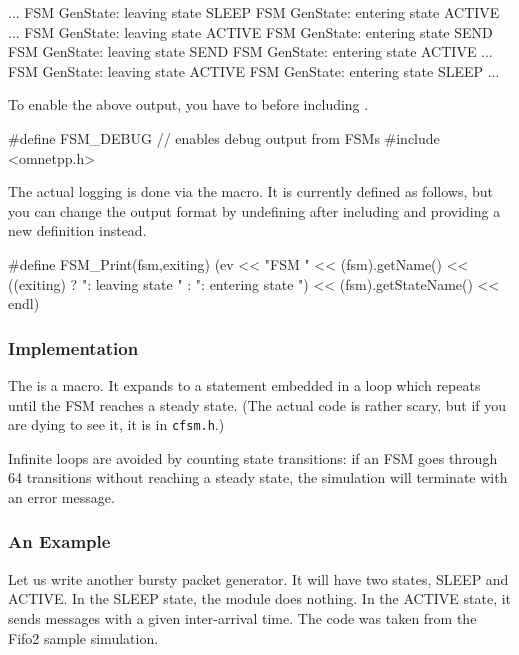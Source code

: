 \begin{filelisting}
...
FSM GenState: leaving state SLEEP
FSM GenState: entering state ACTIVE
...
FSM GenState: leaving state ACTIVE
FSM GenState: entering state SEND
FSM GenState: leaving state SEND
FSM GenState: entering state ACTIVE
...
FSM GenState: leaving state ACTIVE
FSM GenState: entering state SLEEP
...
\end{filelisting}

To enable the above output, you have to 
before including .

\begin{cpp}
#define FSM_DEBUG    // enables debug output from FSMs
#include <omnetpp.h>
\end{cpp}

The actual logging is done via the  macro.
It is currently defined as follows, but you can change the
output format by undefining  after including
 and providing a new definition instead.

\begin{cpp}
#define FSM_Print(fsm,exiting)
  (ev << "FSM " << (fsm).getName()
      << ((exiting) ? ": leaving state " : ": entering state ")
      << (fsm).getStateName() << endl)
\end{cpp}


\subsubsection{Implementation}


The  is a macro. It expands to a 
statement embedded in a  loop which repeats until the
FSM reaches a steady state. (The actual code is rather
scary, but if you are dying to see it, it is in \texttt{cfsm.h}.)

Infinite loops are avoided by counting state transitions: if
an FSM goes through 64 transitions without reaching a steady
state, the simulation will terminate with an error message.


\subsubsection{An Example}


Let us write another bursty packet generator. It will have two
states, SLEEP and ACTIVE. In the SLEEP state, the module does
nothing. In the ACTIVE state, it sends messages with a given
inter-arrival time. The code was taken from the Fifo2 sample
simulation.


